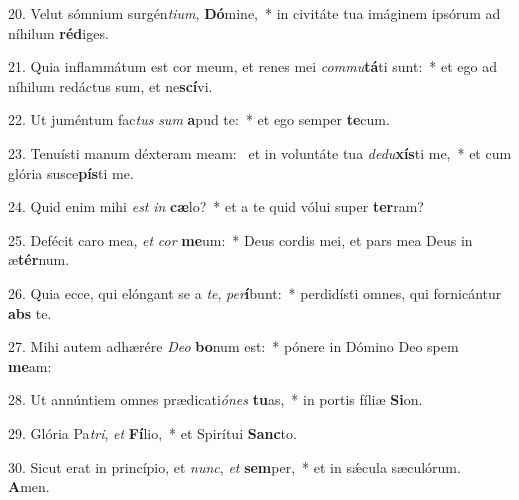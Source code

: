 20. Velut sómnium surgén\textit{ti}\textit{um}, \textbf{Dó}mine,~*  in civitáte tua imáginem ipsórum ad níhilum \textbf{réd}iges.\

21. Quia inflammátum est cor meum, et renes mei \textit{com}\textit{mu}\textbf{tá}ti sunt:~*  et ego ad níhilum redáctus sum, et ne\textbf{scí}vi.\

22. Ut juméntum fac\textit{tus} \textit{sum} \textbf{a}pud te:~*  et ego semper \textbf{te}cum.\

23. Tenuísti manum déxteram meam: \dag\  et in voluntáte tua \textit{de}\textit{du}\textbf{xís}ti me,~*  et cum glória susce\textbf{pís}ti me.\

24. Quid enim mihi \textit{est} \textit{in} \textbf{cæ}lo?~*  et a te quid vólui super \textbf{ter}ram?\

25. Defécit caro mea, \textit{et} \textit{cor} \textbf{me}um:~*  Deus cordis mei, et pars mea Deus in æ\textbf{tér}num.\

26. Quia ecce, qui elóngant se a \textit{te}, \textit{per}\textbf{í}bunt:~*  perdidísti omnes, qui fornicántur \textbf{abs} te.\

27. Mihi autem adhærére \textit{De}\textit{o} \textbf{bo}num est:~*  pónere in Dómino Deo spem \textbf{me}am:\

28. Ut annúntiem omnes prædicati\textit{ó}\textit{nes} \textbf{tu}as,~*  in portis fíliæ \textbf{Si}on.\

29. Glória Pa\textit{tri}, \textit{et} \textbf{Fí}lio,~*  et Spirítui \textbf{Sanc}to.\

30. Sicut erat in princípio, et \textit{nunc}, \textit{et} \textbf{sem}per,~*  et in sǽcula sæculórum. \textbf{A}men.\

